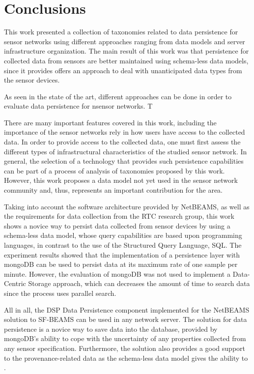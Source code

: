 

\chapter{Conclusions}

This work presented a collection of taxonomies related to data persistence for
sensor networks using different approaches ranging from data models and server
infrastructure organization. The main result of this work was that persistence
for collected data from sensors are better maintained using schema-less data
models, since it provides offers an approach to deal with unanticipated data
types from the sensor devices.

As seen in the state of the art, different approaches can be done in order to
evaluate data persistence for nsensor networks. T

There are many important features covered in this work, including the
importance of the sensor networks rely in how users have access to the
collected data. In order to provide access to the collected data, one must
first assess the different types of infrastructural characteristics of the
studied sensor network. In general, the selection of a technology that
provides such persistence capabilities can be part of a process of analysis of
taxonomies proposed by this work. However, this work proposes a data model not
yet used in the sensor network community and, thus, represents an important
contribution for the area.

Taking into account the software architecture provided by NetBEAMS, as well as
the requirements for data collection from the RTC research group, this work
shows a novice way to persist data collected from sensor devices by using a
schema-less data model, whose query capabilities are based upon programming
languages, in contrast to the use of the Structured Query Language, SQL. The
experiment results showed that the implementation of a persistence layer with
mongoDB can be used to persist data at its maximum rate of one sample per
minute. However, the evaluation of mongoDB was not used to implement a
Data-Centric Storage approach, which can decreases the amount of time to search
data since the process uses parallel search.

All in all, the DSP Data Persistence component implemented for the NetBEAMS
solution to SF-BEAMS can be used in any network server. The solution for data
persistence is a novice way to save data into the database, provided by
mongoDB's ability to cope with the uncertainty of any properties collected from
any sensor specification. Furthermore, the solution also provides a good
support to the provenance-related data as the schema-less data model gives the
ability to .


